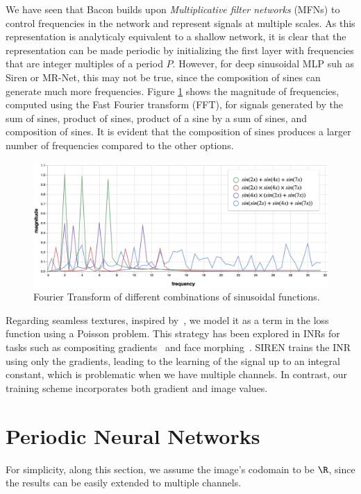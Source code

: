 We have seen that Bacon \cite{bacon2021} builds upon \textit{Multiplicative filter networks} (MFNs) \cite{fathony2020multiplicative} to control frequencies in the network and represent signals at multiple scales. As this representation is analyticaly equivalent to a shallow network, it is clear that the representation can be made periodic by initializing the first layer with frequencies that are integer multiples of a period $P$. However, for deep sinusoidal MLP suh as Siren or MR-Net, this may not be true, since the composition of sines can generate much more frequencies. Figure \ref{f:generated-frequencies} shows the magnitude of frequencies, computed using the Fast Fourier transform (FFT), for signals generated by the sum of sines, product of sines, product of a sine by a sum of sines, and composition of sines. It is evident that the composition of sines produces a larger number of frequencies compared to the other options.

\begin{figure}[h]
\centering
\includegraphics[width=0.60\linewidth]{img/ch6/generated_frequencies.png}
\caption{Fourier Transform of different combinations of sinusoidal functions.}
\label{f:generated-frequencies}
\end{figure}
    

Regarding seamless textures, inspired by~\cite{perez2023poisson}, we model it as a term in the loss function using a Poisson problem. 
This strategy has been explored in INRs for tasks such as compositing gradients~\cite{sitzmann2019siren} and face morphing~\cite{schardong2023neural}. SIREN trains the INR using only the gradients, leading to the learning of the signal up to an integral constant, which is problematic when we have multiple channels. In contrast, our training scheme incorporates both gradient and image values.


\section{Periodic Neural Networks}
For simplicity, along this section, we assume the image's codomain to be $\R$, since the results can be easily extended to multiple channels.

